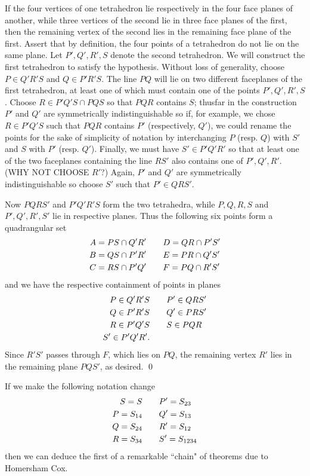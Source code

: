  If the four vertices of one tetrahedron lie respectively in the four face planes of another, while three vertices of the second lie in three face planes of the first, then the remaining vertex of the second lies in the remaining face plane of the first. \endproclaim
\pf Assert that by definition, the four points of a tetrahedron do not lie on the same plane.  Let $P',Q',R',S$ denote the second tetrahedron.  We will construct the first tetrahedron to satisfy the hypothesis.  Without loss of generality, choose $P\in Q'R'S$ and $Q\in P'R'S$.  The line $PQ$ will lie on two different faceplanes of the first tetrahedron, at least one of which must contain one of the points $P',Q',R',S$.  Choose $R\in P'Q'S\cap PQS$ so that $PQR$ contains $S$; thusfar in the construction $P'$ and $Q'$ are symmetrically indistinguishable so if, for example, we chose $R\in P'Q'S$ such that $PQR$ contains $P'$ (respectively, $Q'$), we could rename the points for the sake of simplicity of notation by interchanging $P$ (resp. $Q$) with $S'$ and $S$ with $P'$ (resp. $Q'$).  Finally, we must have $S'\in P'Q'R'$ so that at least one of the two faceplanes containing the line $RS'$ also contains one of $P',Q',R'$.  (WHY NOT CHOOSE $R'$?)  Again, $P'$ and $Q'$ are symmetrically indistinguishable so choose $S'$ such that $P'\in QRS'$.  

Now $PQRS'$ and $P'Q'R'S$ form the two tetrahedra, while $P,Q,R,S$ and $P',Q',R',S'$ lie in respective planes.  Thus the following six points form a quadrangular set
$$\aligned
A=PS\cap Q'R' \qquad& D=QR\cap P'S' \\
B=QS\cap P'R' \qquad& E=PR\cap Q'S' \\
C=RS\cap P'Q' \qquad& F=PQ\cap R'S'
\endaligned$$
and we have the respective containment of points in planes
$$\aligned
P\in Q'R'S \qquad& P'\in QRS' \\
Q\in P'R'S \qquad& Q'\in PRS' \\
R\in P'Q'S \qquad& S\in PQR \\
S'\in P'Q'R'. \qquad&
\endaligned$$
Since $R'S'$ passes through $F$, which lies on $PQ$, the remaining vertex $R'$ lies in the remaining plane $PQS'$, as desired. \qed

If we make the following notation change
$$\aligned
S=S \qquad& P'=S_{23}\\
P=S_{14} \qquad& Q'=S_{13} \\
Q=S_{24} \qquad& R'=S_{12} \\
R=S_{34} \qquad& S'=S_{1234}
\endaligned$$
then we can deduce the first of a remarkable ``chain" of theorems due to Homersham Cox.


